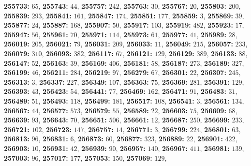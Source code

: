 \textsf{\bfseries 255733:} $65$, \textsf{\bfseries 255743:} $44$, \textsf{\bfseries 255757:} $242$, \textsf{\bfseries 255763:} $30$, \textsf{\bfseries 255767:} $20$, \textsf{\bfseries 255803:} $200$, \textsf{\bfseries 255839:} $293$, \textsf{\bfseries 255841:} $161$, \textsf{\bfseries 255847:} $174$, \textsf{\bfseries 255851:} $177$, \textsf{\bfseries 255859:} $3$, \textsf{\bfseries 255869:} $39$, \textsf{\bfseries 255877:} $24$, \textsf{\bfseries 255887:} $168$, \textsf{\bfseries 255907:} $50$, \textsf{\bfseries 255917:} $103$, \textsf{\bfseries 255919:} $482$, \textsf{\bfseries 255923:} $17$, \textsf{\bfseries 255947:} $56$, \textsf{\bfseries 255961:} $70$, \textsf{\bfseries 255971:} $114$, \textsf{\bfseries 255973:} $61$, \textsf{\bfseries 255977:} $41$, \textsf{\bfseries 255989:} $28$, \textsf{\bfseries 256019:} $205$, \textsf{\bfseries 256021:} $79$, \textsf{\bfseries 256031:} $209$, \textsf{\bfseries 256033:} $11$, \textsf{\bfseries 256049:} $215$, \textsf{\bfseries 256057:} $233$, \textsf{\bfseries 256079:} $310$, \textsf{\bfseries 256093:} $382$, \textsf{\bfseries 256117:} $67$, \textsf{\bfseries 256121:} $129$, \textsf{\bfseries 256129:} $389$, \textsf{\bfseries 256133:} $88$, \textsf{\bfseries 256147:} $52$, \textsf{\bfseries 256163:} $39$, \textsf{\bfseries 256169:} $406$, \textsf{\bfseries 256181:} $58$, \textsf{\bfseries 256187:} $273$, \textsf{\bfseries 256189:} $327$, \textsf{\bfseries 256199:} $46$, \textsf{\bfseries 256211:} $284$, \textsf{\bfseries 256219:} $97$, \textsf{\bfseries 256279:} $67$, \textsf{\bfseries 256301:} $22$, \textsf{\bfseries 256307:} $245$, \textsf{\bfseries 256313:} $3$, \textsf{\bfseries 256337:} $227$, \textsf{\bfseries 256349:} $107$, \textsf{\bfseries 256363:} $75$, \textsf{\bfseries 256369:} $281$, \textsf{\bfseries 256391:} $129$, \textsf{\bfseries 256393:} $43$, \textsf{\bfseries 256423:} $54$, \textsf{\bfseries 256441:} $77$, \textsf{\bfseries 256469:} $162$, \textsf{\bfseries 256471:} $91$, \textsf{\bfseries 256483:} $31$, \textsf{\bfseries 256489:} $51$, \textsf{\bfseries 256493:} $118$, \textsf{\bfseries 256499:} $181$, \textsf{\bfseries 256517:} $108$, \textsf{\bfseries 256541:} $3$, \textsf{\bfseries 256561:} $134$, \textsf{\bfseries 256567:} $44$, \textsf{\bfseries 256577:} $573$, \textsf{\bfseries 256579:} $55$, \textsf{\bfseries 256589:} $22$, \textsf{\bfseries 256603:} $75$, \textsf{\bfseries 256609:} $68$, \textsf{\bfseries 256639:} $93$, \textsf{\bfseries 256643:} $70$, \textsf{\bfseries 256651:} $506$, \textsf{\bfseries 256661:} $12$, \textsf{\bfseries 256687:} $250$, \textsf{\bfseries 256699:} $233$, \textsf{\bfseries 256721:} $102$, \textsf{\bfseries 256723:} $147$, \textsf{\bfseries 256757:} $14$, \textsf{\bfseries 256771:} $3$, \textsf{\bfseries 256799:} $224$, \textsf{\bfseries 256801:} $63$, \textsf{\bfseries 256813:} $96$, \textsf{\bfseries 256831:} $6$, \textsf{\bfseries 256873:} $60$, \textsf{\bfseries 256877:} $323$, \textsf{\bfseries 256889:} $22$, \textsf{\bfseries 256901:} $422$, \textsf{\bfseries 256903:} $10$, \textsf{\bfseries 256931:} $42$, \textsf{\bfseries 256939:} $90$, \textsf{\bfseries 256957:} $140$, \textsf{\bfseries 256967:} $411$, \textsf{\bfseries 256981:} $139$, \textsf{\bfseries 257003:} $96$, \textsf{\bfseries 257017:} $177$, \textsf{\bfseries 257053:} $150$, \textsf{\bfseries 257069:} $129$, 
